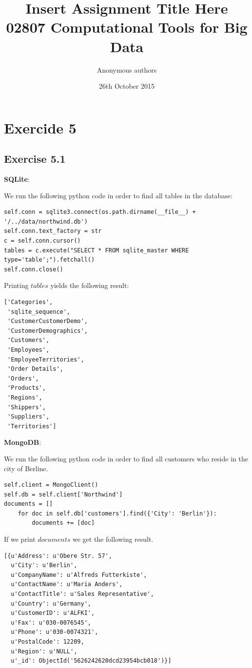 \documentclass{article}
\title{Insert Assignment Title Here\\02807 Computational Tools for Big Data}
\author{Anonymous authors}
\date{26th October 2015}
\begin{document}
\maketitle

\section{Exercide 5}
\label{sec:Exercide 5}

\subsection{Exercise 5.1}
\label{sub:Exercise 5.1}

\textbf{SQLite}:

We run the following python code in order to find all tables in the database:

\begin{lstlisting}
self.conn = sqlite3.connect(os.path.dirname(__file__) + '/../data/northwind.db')
self.conn.text_factory = str
c = self.conn.cursor()
tables = c.execute("SELECT * FROM sqlite_master WHERE type='table';").fetchall()
self.conn.close()
\end{lstlisting}

Printing $tables$ yields the following result:

\begin{lstlisting}
['Categories',
 'sqlite_sequence',
 'CustomerCustomerDemo',
 'CustomerDemographics',
 'Customers',
 'Employees',
 'EmployeeTerritories',
 'Order Details',
 'Orders',
 'Products',
 'Regions',
 'Shippers',
 'Suppliers',
 'Territories']
\end{lstlisting}

\newpage

\textbf{MongoDB}:

We run the following python code in order to find all customers who reside in the city of Berline.

\begin{lstlisting}
self.client = MongoClient()
self.db = self.client['Northwind']
documents = []
    for doc in self.db['customers'].find({'City': 'Berlin'}):
        documents += [doc]
\end{lstlisting}

If we print $documents$ we get the following result.

\begin{lstlisting}
[{u'Address': u'Obere Str. 57',
  u'City': u'Berlin',
  u'CompanyName': u'Alfreds Futterkiste',
  u'ContactName': u'Maria Anders',
  u'ContactTitle': u'Sales Representative',
  u'Country': u'Germany',
  u'CustomerID': u'ALFKI',
  u'Fax': u'030-0076545',
  u'Phone': u'030-0074321',
  u'PostalCode': 12209,
  u'Region': u'NULL',
  u'_id': ObjectId('5626242620dcd23954bcb018')}]
\end{lstlisting}
\end{document}
